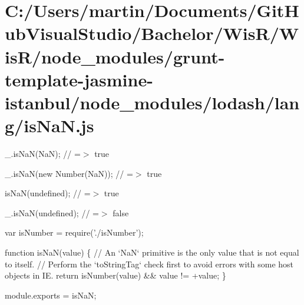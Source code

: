 \hypertarget{_c_1_2_users_2martin_2_documents_2_git_hub_visual_studio_2_bachelor_2_wis_r_2_wis_r_2node_modulec8ea313bd673a11b08a6e0dd9f6e966d}{}\section{C\+:/\+Users/martin/\+Documents/\+Git\+Hub\+Visual\+Studio/\+Bachelor/\+Wis\+R/\+Wis\+R/node\+\_\+modules/grunt-\/template-\/jasmine-\/istanbul/node\+\_\+modules/lodash/lang/is\+Na\+N.\+js}
\+\_\+.\+is\+Na\+N(\+Na\+N); // =$>$ true

\+\_\+.\+is\+Na\+N(new Number(\+Na\+N)); // =$>$ true

is\+Na\+N(undefined); // =$>$ true

\+\_\+.\+is\+Na\+N(undefined); // =$>$ false


\begin{DoxyCodeInclude}
var isNumber = require(\textcolor{stringliteral}{'./isNumber'});

\textcolor{keyword}{function} isNaN(value) \{
  \textcolor{comment}{// An `NaN` primitive is the only value that is not equal to itself.}
  \textcolor{comment}{// Perform the `toStringTag` check first to avoid errors with some host objects in IE.}
  \textcolor{keywordflow}{return} isNumber(value) && value != +value;
\}

module.exports = isNaN;
\end{DoxyCodeInclude}
 